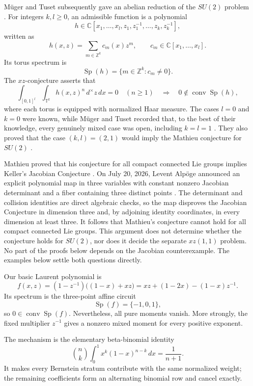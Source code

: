 \documentclass[11pt]{article}
\newcommand{\C}{\mathbb C}
\newcommand{\T}{\mathbb T}
\newcommand{\Sp}{\operatorname{Sp}}
\theoremstyle{remark}
\begin{document}
M\"uger and Tuset subsequently gave an abelian reduction of the $SU(2)$ problem \cite{MugerTuset}.  For integers $k,l\geq0$, an admissible function is a polynomial
\[
  h\in
  \C[x_1,\dots,x_l,z_1,z_1^{-1},\dots,z_k,z_k^{-1}],
\]
written as
\[
  h(x,z)=\sum_{m\in\mathbb Z^k}c_m(x)z^m,
  \qquad c_m\in\C[x_1,\dots,x_l].
\]
Its torus spectrum is
\[
  \Sp(h)=\{m\in\mathbb Z^k:c_m\neq0\}.
\]
The $xz$-conjecture asserts that
\begin{equation}\label{eq:xz-conjecture}
  \int_{[0,1]^l}\int_{\T^k}h(x,z)^n\,d^\times z\,dx=0
  \quad(n\geq1)
  \quad\Longrightarrow\quad
  0\notin\operatorname{conv}\Sp(h),
\end{equation}
where each torus is equipped with normalized Haar measure.  The cases $l=0$ and $k=0$ were known, while M\"uger and Tuset recorded that, to the best of their knowledge, every genuinely mixed case was open, including $k=l=1$ \cite[Remark~2.4]{MugerTuset}.  They also proved that the case $(k,l)=(2,1)$ would imply the Mathieu conjecture for $SU(2)$ \cite[Theorem~2.5]{MugerTuset}.

Mathieu proved that his conjecture for all compact connected Lie groups implies Keller's Jacobian Conjecture \cite{Mathieu,Keller}.  On July 20, 2026, Levent Alp\"oge announced an explicit polynomial map in three variables with constant nonzero Jacobian determinant and a fiber containing three distinct points \cite{Alpoge}.  The determinant and collision identities are direct algebraic checks, so the map disproves the Jacobian Conjecture in dimension three and, by adjoining identity coordinates, in every dimension at least three.  It follows that Mathieu's conjecture cannot hold for all compact connected Lie groups.  This argument does not determine whether the conjecture holds for $SU(2)$, nor does it decide the separate $xz(1,1)$ problem.  No part of the proofs below depends on the Jacobian counterexample.  The examples below settle both questions directly.

Our basic Laurent polynomial is
\begin{equation}\label{eq:basic-f}
  f(x,z)
  =(1-z^{-1})\bigl((1-x)+xz\bigr)
  =xz+(1-2x)-(1-x)z^{-1}.
\end{equation}
Its spectrum is the three-point affine circuit
\[
  \Sp(f)=\{-1,0,1\},
\]
so $0\in\operatorname{conv}\Sp(f)$.  Nevertheless, all pure moments vanish.  More strongly, the fixed multiplier $z^{-1}$ gives a nonzero mixed moment for every positive exponent.

The mechanism is the elementary beta-binomial identity
\begin{equation}\label{eq:beta-binomial-intro}
  \binom nk\int_0^1x^k(1-x)^{n-k}\,dx=\frac1{n+1}.
\end{equation}
It makes every Bernstein stratum contribute with the same normalized weight; the remaining coefficients form an alternating binomial row and cancel exactly.
\end{document}
